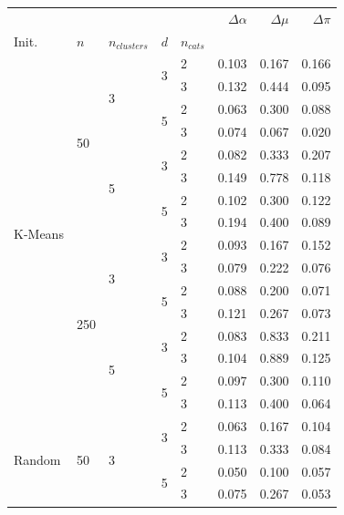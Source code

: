 \documentclass[a4paper,12pt]{article}
\begin{document}
\begin{table}[H]
\begin{minipage}{.48\columnwidth}
\begin{adjustbox}{width=\columnwidth}
\begin{tabular}{lllllrrr}
\toprule
 &  &  &  &  & $\Delta \alpha$ & $\Delta \mu$ & $\Delta \pi$ \\
Init. & $n$ & $n_{clusters}$ & $d$ & $n_{cats}$ &  &  &  \\
\midrule
\multirow[t]{16}{*}{K-Means} & \multirow[t]{8}{*}{50} & \multirow[t]{4}{*}{3} & \multirow[t]{2}{*}{3} & 2 & 0.103 & 0.167 & 0.166 \\
 &  &  &  & 3 & 0.132 & 0.444 & 0.095 \\
\cline{4-8}
 &  &  & \multirow[t]{2}{*}{5} & 2 & 0.063 & 0.300 & 0.088 \\
 &  &  &  & 3 & 0.074 & 0.067 & 0.020 \\
\cline{3-8} \cline{4-8}
 &  & \multirow[t]{4}{*}{5} & \multirow[t]{2}{*}{3} & 2 & 0.082 & 0.333 & 0.207 \\
 &  &  &  & 3 & 0.149 & 0.778 & 0.118 \\
\cline{4-8}
 &  &  & \multirow[t]{2}{*}{5} & 2 & 0.102 & 0.300 & 0.122 \\
 &  &  &  & 3 & 0.194 & 0.400 & 0.089 \\
\cline{2-8} \cline{3-8} \cline{4-8}
 & \multirow[t]{8}{*}{250} & \multirow[t]{4}{*}{3} & \multirow[t]{2}{*}{3} & 2 & 0.093 & 0.167 & 0.152 \\
 &  &  &  & 3 & 0.079 & 0.222 & 0.076 \\
\cline{4-8}
 &  &  & \multirow[t]{2}{*}{5} & 2 & 0.088 & 0.200 & 0.071 \\
 &  &  &  & 3 & 0.121 & 0.267 & 0.073 \\
\cline{3-8} \cline{4-8}
 &  & \multirow[t]{4}{*}{5} & \multirow[t]{2}{*}{3} & 2 & 0.083 & 0.833 & 0.211 \\
 &  &  &  & 3 & 0.104 & 0.889 & 0.125 \\
\cline{4-8}
 &  &  & \multirow[t]{2}{*}{5} & 2 & 0.097 & 0.300 & 0.110 \\
 &  &  &  & 3 & 0.113 & 0.400 & 0.064 \\
\cline{1-8} \cline{2-8} \cline{3-8} \cline{4-8}
\multirow[t]{16}{*}{Random} & \multirow[t]{8}{*}{50} & \multirow[t]{4}{*}{3} & \multirow[t]{2}{*}{3} & 2 & 0.063 & 0.167 & 0.104 \\
 &  &  &  & 3 & 0.113 & 0.333 & 0.084 \\
\cline{4-8}
 &  &  & \multirow[t]{2}{*}{5} & 2 & 0.050 & 0.100 & 0.057 \\
 &  &  &  & 3 & 0.075 & 0.267 & 0.053 \\

\end{tabular}
\end{adjustbox}
\end{minipage}
\end{table}
\end{document}
